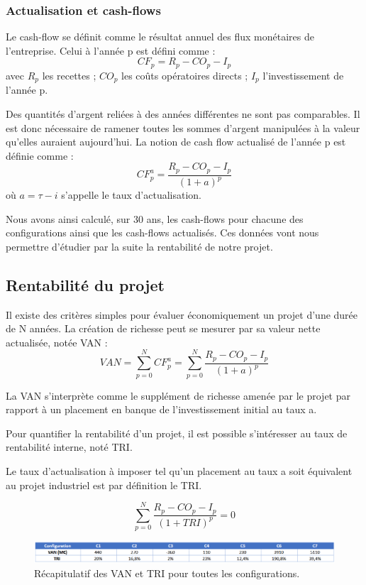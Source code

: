 \documentclass[11pt,french,a4paper]{article}
\begin{document}
\subsubsection{Actualisation et cash-flows}
Le cash-flow se définit comme le résultat annuel des flux monétaires de l'entreprise. 
Celui à l'année p est défini comme : $$CF_p = R_p - CO_p - I_p $$ avec $R_p$ les recettes ; $CO_p$ les coûts opératoires directs ; $I_p$ l'investissement de l'année p.

Des quantités d'argent reliées à des années différentes ne sont pas comparables. Il est donc nécessaire de ramener toutes les sommes d'argent manipulées à la valeur qu'elles auraient aujourd'hui. La notion de cash flow actualisé de l'année p est définie comme : $$ CF^a_p = \frac{R_p - CO_p - I_p}{(1+a)^p} $$ où $ a = \tau - i $ s'appelle le taux d'actualisation.

Nous avons ainsi calculé, sur 30 ans, les cash-flows pour chacune des configurations ainsi que les cash-flows actualisés.  
Ces données vont nous permettre d’étudier par la suite la rentabilité de notre projet.  


\subsection{Rentabilité du projet}

Il existe des critères simples pour évaluer économiquement un projet d'une durée de N années. 
La création de richesse peut se mesurer par sa valeur nette actualisée, notée VAN :
$$ VAN = \sum_{p=0}^{N} CF^a_p = \sum_{p=0}^{N} \frac{R_p - CO_p - I_p}{(1+a)^p} $$

La VAN s'interprète comme le supplément de richesse amenée par le projet par rapport à un placement en banque de l'investissement initial au taux a.

Pour quantifier la rentabilité d'un projet, il est possible s'intéresser au taux de rentabilité interne, noté TRI.  

Le taux d'actualisation à imposer tel qu'un placement au taux a soit équivalent au projet industriel est par définition le TRI.

$$ \sum_{p=0}^{N} \frac{R_p - CO_p - I_p}{(1+TRI)^p} = 0 $$

\begin{figure}[h!]
\centering
\includegraphics[width=0.9\linewidth]{image/chap5/Tableau 4 chap 5.png}
\caption{ Récapitulatif des VAN et TRI pour toutes les configurations. }
\end{figure}
\end{document}
